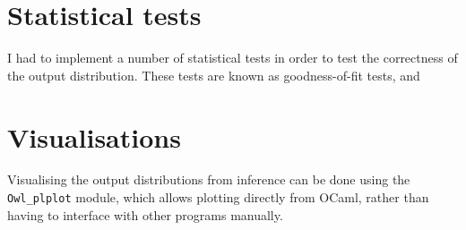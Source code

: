 
\section{Statistical tests}
I had to implement a number of statistical tests in order to test the correctness of the output distribution. These tests are known as goodness-of-fit tests, and 

\section{Visualisations}
Visualising the output distributions from inference can be done using the \texttt{Owl\_plplot} module, which allows plotting directly from OCaml, rather than having to interface with other programs manually.